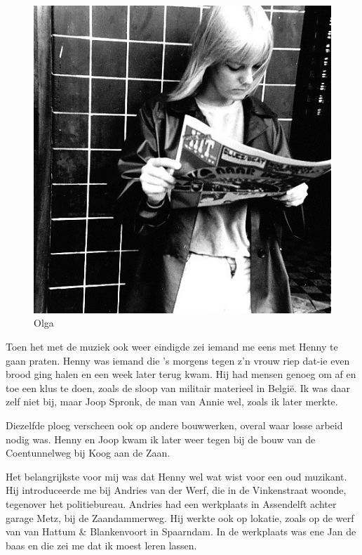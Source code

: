\documentclass[10pt,twoside, openright]{memoir}
\begin{document}
\begin{figure}
\includegraphics[width=\textwidth]{img/ch38/olga}
\caption*{\footnotesize Olga}
\end{figure}

Toen het met de muziek ook weer eindigde zei iemand me eens met Henny te gaan praten. Henny was iemand die ’s morgens tegen z’n vrouw riep dat-ie even brood ging halen en een week later terug kwam. Hij had mensen genoeg om af en toe een klus te doen, zoals de sloop van militair materieel in België. Ik was daar zelf niet bij, maar Joop Spronk, de man van Annie wel, zoals ik later merkte. 

Diezelfde ploeg verscheen ook op andere bouwwerken, overal waar losse arbeid nodig was. Henny en Joop kwam ik later weer tegen bij de bouw van de Coentunnelweg bij Koog aan de Zaan. 

Het belangrijkste voor mij was dat Henny wel wat wist voor een oud muzikant. Hij introduceerde me bij Andries van der Werf, die in de Vinkenstraat woonde, tegenover het politiebureau. Andries had een werkplaats in Assendelft achter garage Metz, bij de Zaandammerweg. Hij werkte ook op lokatie, zoals op de werf van van Hattum \& Blankenvoort in Spaarndam. In de werkplaats was ene Jan de baas en die zei me dat ik moest leren lassen. 
\end{document}
